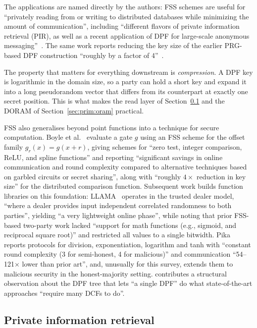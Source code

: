 The applications are named directly by the authors: FSS schemes are useful for ``privately reading
from or writing to distributed databases while minimizing the amount of communication'',
including ``different flavors of private information retrieval (PIR), as well as a recent
application of DPF for large-scale anonymous messaging''~\cite{bgi2016}. The same work reports
reducing the key size of the earlier PRG-based DPF construction ``roughly by a factor of
4''~\cite{bgi2016}.

The property that matters for everything downstream is \emph{compression}. A DPF key is
logarithmic in the domain size, so a party can hold a short key and expand it into a long
pseudorandom vector that differs from its counterpart at exactly one secret position. This is
what makes the read layer of Section~\ref{sec:prim:pir} and the DORAM of
Section~\ref{sec:prim:oram} practical.

FSS also generalises beyond point functions into a technique for secure computation. Boyle et
al.~\cite{boyle2021} evaluate a gate $g$ using an FSS scheme for the offset family
$g_r(x) = g(x + r)$, giving schemes for ``zero test, integer comparison, ReLU, and spline
functions'' and reporting ``significant savings in online communication and round complexity
compared to alternative techniques based on garbled circuits or secret sharing'', along with
``roughly $4\times$ reduction in key size'' for the distributed comparison function. Subsequent
work builds function libraries on this foundation: LLAMA~\cite{llama2022} operates in the trusted
dealer model, ``where a dealer provides input independent correlated randomness to both
parties'', yielding ``a very lightweight online phase'', while noting that prior FSS-based
two-party work lacked ``support for math functions (e.g., sigmoid, and reciprocal square root)''
and restricted all values to a single bitwidth. Pika~\cite{pika2022} reports protocols for
division, exponentiation, logarithm and tanh with ``constant round complexity (3 for semi-honest,
4 for malicious)'' and communication ``54--121$\times$ lower than prior art'', and, unusually
for this survey, extends them to malicious security in the honest-majority setting.
\grotto{} contributes a structural observation about the DPF tree that lets ``a single DPF'' do
what state-of-the-art approaches ``require many DCFs to do''.

\subsection{Private information retrieval}
\label{sec:prim:pir}

